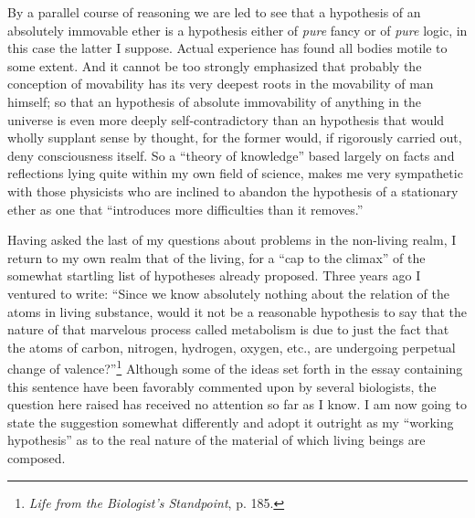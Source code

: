 \documentclass[a4paper, 11pt, oneside, polutonikogreek, english, landscape]{article}
\begin{document}
By a parallel course of reasoning we are led to see that a hypothesis of an absolutely immovable ether is a hypothesis either of \emph{pure} fancy or of \emph{pure} logic, in this case the latter I suppose. Actual experience has found all bodies motile to some extent. And it cannot be too strongly emphasized that probably the conception of movability has its very deepest roots in the movability of man himself; so that an hypothesis of absolute immovability of anything in the universe is even more deeply self-contradictory than an hypothesis that would wholly supplant sense by thought, for the former would, if rigorously carried out, deny consciousness itself. So a ``theory of knowledge'' based largely on facts and reflections lying quite within my own field of science, makes me very sympathetic with those physicists who are inclined to abandon the hypothesis of a stationary ether as one that ``introduces more difficulties than it removes.''

Having asked the last of my questions about problems in the non-living realm, I return to my own realm that of the living, for a ``cap to the climax'' of the somewhat startling list of hypotheses already proposed. Three years ago I ventured to write: ``Since we know absolutely nothing about the relation of the atoms in living substance, would it not be a reasonable hypothesis to say that the nature of that marvelous process called metabolism is due to just the fact that the atoms of carbon, nitrogen, hydrogen, oxygen, etc., are undergoing perpetual change of valence?''\footnote{\emph{Life from the Biologist's Standpoint}, p. 185.} Although some of the ideas set forth in the essay containing this sentence have been favorably commented upon by several biologists, the question here raised has received no attention so far as I know. I am now going to state the suggestion somewhat differently and adopt it outright as my ``working hypothesis'' as to the real nature of the material of which living beings are composed.
\end{document}
